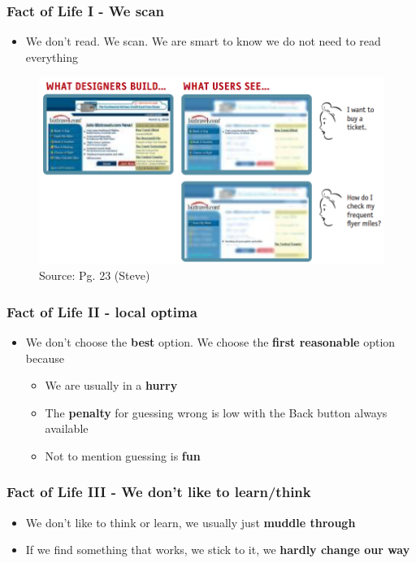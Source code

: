 \documentclass{beamer}
\begin{document}
\begin{frame}
	\frametitle{Fact of Life I - We scan}
	\begin{itemize}
		\item We don't read.  We scan.  We are smart to know we do not need to read everything
	\end{itemize}
	\begin{figure}
		\includegraphics[width=0.7\linewidth]{steve/fact1}
		\caption{Source: Pg. 23 (Steve)}
	\end{figure}
\end{frame}

\begin{frame}
	\frametitle{Fact of Life II - local optima}
	\begin{itemize}
		\item We don't choose the \textbf{best} option.  We choose the \textbf{first reasonable} option because
		\begin{itemize}
			\item We are usually in a \textbf{hurry}
			\item The \textbf{penalty} for guessing wrong is low with the Back button always available
			\item Not to mention guessing is \textbf{fun} 
		\end{itemize} 
	\end{itemize}
\end{frame}

\begin{frame}
	\frametitle{Fact of Life III - We don't like to learn/think}
	\begin{itemize}
		\item We don't like to think or learn, we usually just \textbf{muddle through} 
		\item If we find something that works, we stick to it, we \textbf{hardly change our way}
	\end{itemize}
\end{frame}
\end{document}
